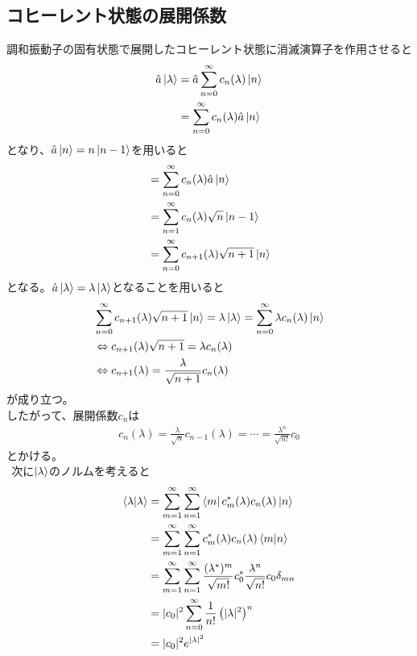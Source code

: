 \documentclass{jsarticle}  %
\numberwithin{equation}{section} %
\numberwithin{figure}{section}
\begin{document}
\subsection{コヒーレント状態の展開係数}
    調和振動子の固有状態で展開したコヒーレント状態に消滅演算子を作用させると
    \begin{align}
        \hat{a}\ket{\lambda} &= \hat{a}\sum_{n=0}^{\infty} c_n(\lambda) \ket{n} \notag \\
        &= \sum_{n=0}^{\infty} c_n(\lambda) \hat{a}\ket{n}
    \end{align}
    となり、$\hat{a}\ket{n} = n \ket{n-1}$を用いると
    \begin{align}
        &= \sum_{n=0}^{\infty} c_n(\lambda) \hat{a}\ket{n} \notag \\
        &= \sum_{n=1}^{\infty} c_n(\lambda) \sqrt{n}\ket{n-1} \notag \\
        &= \sum_{n=0}^{\infty} c_{n+1}(\lambda) \sqrt{n+1}\ket{n}
    \end{align}
    となる。$\hat{a}\ket{\lambda} = \lambda \ket{\lambda}$となることを用いると
    \begin{align}
         &\sum_{n=0}^{\infty} c_{n+1}(\lambda) \sqrt{n+1}\ket{n} = \lambda \ket{\lambda} = \sum_{n=0}^\infty \lambda c_n(\lambda) \ket{n} \notag \\
         &\Leftrightarrow c_{n+1}(\lambda) \sqrt{n+1} = \lambda c_n(\lambda) \notag \\
         &\Leftrightarrow c_{n+1}(\lambda)  = \frac{\lambda}{\sqrt{n+1}} c_n(\lambda)
    \end{align}
    が成り立つ。\\
    したがって、展開係数$c_n$は
    \begin{align}
        c_n(\lambda) = \frac{\lambda}{\sqrt{n}}c_{n-1}(\lambda) = \cdots = \frac{\lambda^n}{\sqrt{n!}}c_0
    \end{align}
    とかける。\\
    $\ \ $次に$\ket{\lambda}$のノルムを考えると
    \begin{align}
        \braket{\lambda | \lambda} &= \sum_{m = 1}^\infty \sum_{n = 1}^\infty \bra{m} c_m^*(\lambda) c_n(\lambda)\ket{n} \notag \\
        &= \sum_{m = 1}^\infty \sum_{n = 1}^\infty c_m^*(\lambda) c_n(\lambda)\braket{m|n} \notag \\
        &= \sum_{m = 1}^\infty \sum_{n = 1}^\infty\frac{(\lambda^*)^m}{\sqrt{m!}}c_0^* \frac{\lambda^n}{\sqrt{n!}}c_0\delta_{mn} \notag \\
        &= |c_0|^2\sum_{n=0}^\infty \frac{1}{n!} \left( |\lambda|^2 \right)^n \notag \\
        &= |c_0|^2 e^{|\lambda|^2}
    \end{align}
\end{document}
